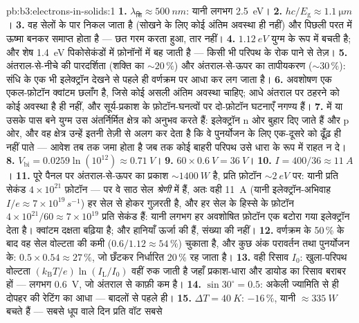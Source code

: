 \begin{solution}{pb:b3:electrons-in-solids:1}
\textbf{1.} $\lambda_{\text{शि}} \approx \qty{500}{nm}$:
यानी लगभग \qty{2.5}{eV}।
\textbf{2.} $hc/E_{\text{g}} \approx \qty{1.1}{\micro m}$।
\textbf{3.} वह सेलों के पार निकल जाता है (सोखने के लिए कोई अंतिम
अवस्था ही नहीं) और पिछली परत में ऊष्मा बनकर समाप्त होता है --- छत
गरम करता हुआ, तार नहीं।
\textbf{4.} $\qty{1.12}{eV}$ युग्म के रूप में बचती है; और शेष
\qty{1.4}{eV} पिकोसेकंडों में फ़ोनॉनों में बह जाती है --- किसी भी
परिपथ के रोक पाने से तेज़।
\textbf{5.} अंतराल-से-नीचे की पारदर्शिता (शक्ति का $\sim20\,\%$) और
अंतराल-से-ऊपर का तापीयकरण ($\sim30\,\%$): संधि के एक भी इलेक्ट्रॉन
देखने से पहले ही वर्णक्रम पर आधा कर लग जाता है।
\textbf{6.} अवशोषण एक एकल-फ़ोटॉन क्वांटम छलाँग है, जिसे कोई असली
अंतिम अवस्था चाहिए; आधे अंतराल पर ठहरने को कोई अवस्था है ही नहीं, और
सूर्य-प्रकाश के फ़ोटॉन-घनत्वों पर दो-फ़ोटॉन घटनाएँ नगण्य हैं।
\textbf{7.}  में या उसके पास बने युग्म उस
अंतर्निर्मित क्षेत्र को अनुभव करते हैं: इलेक्ट्रॉन n ओर बुहार दिए
जाते हैं और  p ओर, और वह क्षेत्र उन्हें इतनी तेज़ी से अलग कर देता
है कि वे पुनर्योजन के लिए एक-दूसरे को ढूँढ़ ही नहीं पाते --- आवेश तब
तक जमा होता है जब तक कोई बाहरी परिपथ उसे धारा के रूप में राहत न दे।
\textbf{8.} $V_{\text{bi}} = 0.0259\ln(10^{12}) \approx
\qty{0.71}{V}$।
\textbf{9.} $60\times\qty{0.6}{V} = \qty{36}{V}$।
\textbf{10.} $I = 400/36 \approx \qty{11}{A}$।
\textbf{11.} पूरे पैनल पर अंतराल-से-ऊपर का प्रकाश
$\sim\qty{1400}{W}$ है, प्रति फ़ोटॉन $\sim\qty{2}{eV}$ पर: यानी प्रति
सेकंड $4\times10^{21}$ फ़ोटॉन --- पर वे साठ सेल \emph{श्रेणी} में
हैं, अतः वही \qty{11}{A} (यानी इलेक्ट्रॉन-अभिवाह $I/e \approx
7\times10^{19}\,\unit{s^{-1}}$) हर सेल से होकर गुज़रती है, और हर सेल
के हिस्से के फ़ोटॉन $4\times10^{21}/60 \approx
7\times10^{19}$ प्रति सेकंड हैं: यानी लगभग हर अवशोषित फ़ोटॉन एक
बटोरा गया इलेक्ट्रॉन देता है। क्वांटम दक्षता बढ़िया है; और
हानियाँ ऊर्जा की हैं, संख्या की नहीं।
\textbf{12.} वर्णक्रम के 50\,\% के बाद वह सेल वोल्टता की कमी
($0.6/1.12 \approx 54\,\%$) चुकाता है, और कुछ अंक
परावर्तन तथा पुनर्योजन के: $0.5\times0.54 \approx 27\,\%$,
जो छँटकर निर्धारित 20\,\% रह जाता है।
\textbf{13.} वही रिसाव $I_0$: खुला-परिपथ वोल्टता
$(k_{\text{B}}T/e)\ln(I_{\text{L}}/I_0)$ वहीं रुक जाती है जहाँ
प्रकाश-धारा और डायोड का रिसाव बराबर हों --- लगभग \qty{0.6}{V}, जो
अंतराल से काफ़ी कम है।
\textbf{14.} $\sin30^\circ = 0.5$: अकेली ज्यामिति से ही दोपहर की
रेटिंग का आधा --- बादलों से पहले ही।
\textbf{15.} $\Delta T = \qty{40}{K}$: $-16\,\%$, यानी
$\approx\qty{335}{W}$ बचते हैं --- सबसे धूप वाले दिन प्रति वॉट सबसे

\end{solution}
